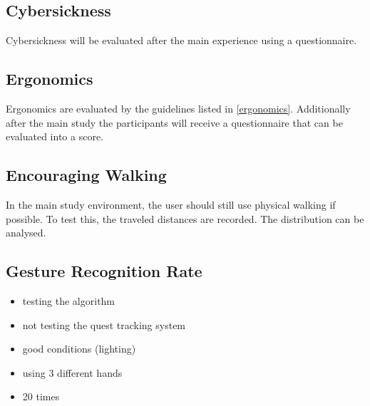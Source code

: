 \subsection{Cybersickness}
Cybersickness will be evaluated after the main experience using a questionnaire.


\subsection{Ergonomics}
Ergonomics are evaluated by the guidelines listed in \ref{ergonomics}. Additionally after the main study the participants will receive a questionnaire that can be evaluated into a score.


\subsection{Encouraging Walking}
In the main study environment, the user should still use physical walking if possible. To test this, the traveled distances are recorded. The distribution can be analysed.







\subsection{Gesture Recognition Rate}
\begin{itemize}
    \item testing the algorithm
    \item not testing the quest tracking system
    \item good conditions (lighting)
    \item using 3 different hands
    \item 20 times
\end{itemize}



